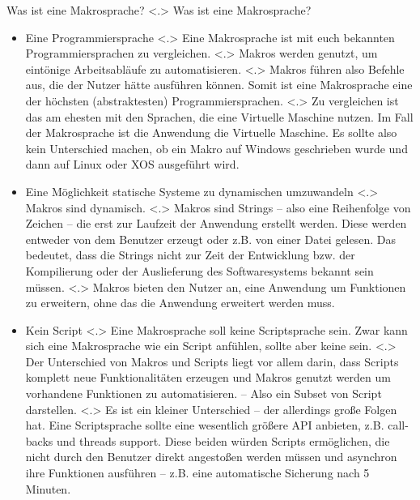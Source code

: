   \begin{frame}{Was ist eine Makrosprache?}
    \pause
        \note[item]<.>{
          Was ist eine Makrosprache?
        }

    \begin{itemize}[<+- | alert@+>]
      \item
        Eine Programmiersprache
            \note[item]<.>{
              Eine Makrosprache ist mit euch bekannten Programmiersprachen zu vergleichen.
            }
            \note[item]<.>{
              Makros werden genutzt, um eintönige Arbeitsabläufe zu automatisieren.
            }
            \note[item]<.>{
              Makros führen also Befehle aus, die der Nutzer hätte ausführen können. Somit ist eine Makrosprache eine der höchsten (abstraktesten) Programmiersprachen.
            }
            \note[item]<.>{
              Zu vergleichen ist das am ehesten mit den Sprachen, die eine Virtuelle Maschine nutzen. Im Fall der Makrosprache ist die Anwendung die Virtuelle Maschine. Es sollte also kein Unterschied machen, ob ein Makro auf Windows geschrieben wurde und dann auf Linux oder XOS ausgeführt wird.
            }

      \item
        Eine Möglichkeit statische Systeme zu dynamischen umzuwandeln
            \note[item]<.>{
              Makros sind dynamisch.
            }
            \note[item]<.>{
              Makros sind Strings -- also eine Reihenfolge von Zeichen -- die erst zur Laufzeit der Anwendung erstellt werden. Diese werden entweder von dem Benutzer erzeugt oder z.B. von einer Datei gelesen. Das bedeutet, dass die Strings nicht zur Zeit der Entwicklung bzw. der Kompilierung oder der Auslieferung des Softwaresystems bekannt sein müssen.
            }
            \note[item]<.>{
              Makros bieten den Nutzer an, eine Anwendung um Funktionen zu erweitern, ohne das die Anwendung erweitert werden muss.
            }

      \item
        Kein Script
            \note[item]<.>{
              Eine Makrosprache soll keine Scriptsprache sein. Zwar kann sich eine Makrosprache wie ein Script anfühlen, sollte aber keine sein.
            }
            \note[item]<.>{
              Der Unterschied von Makros und Scripts liegt vor allem darin, dass Scripts komplett neue Funktionalitäten erzeugen und Makros genutzt werden um vorhandene Funktionen zu automatisieren. -- Also ein Subset von Script darstellen.
            }
            \note[item]<.>{
              Es ist ein kleiner Unterschied -- der allerdings große Folgen hat. Eine Scriptsprache sollte eine wesentlich größere API anbieten, z.B. call-backs und threads support. Diese beiden würden Scripts ermöglichen, die nicht durch den Benutzer direkt angestoßen werden müssen und asynchron ihre Funktionen ausführen -- z.B. eine automatische Sicherung nach 5 Minuten.
            }
    \end{itemize}
  \end{frame}

